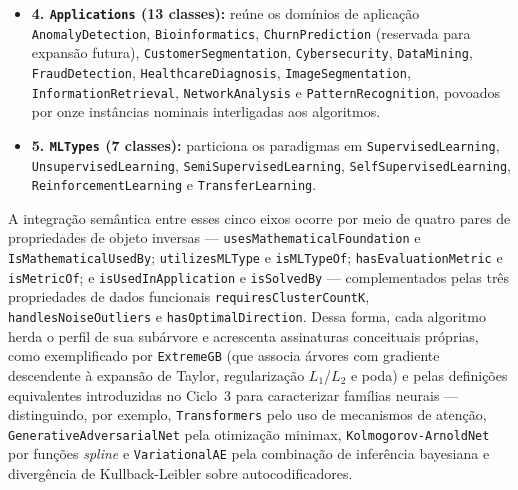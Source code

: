 \documentclass[11pt,a4paper]{article}
\newcommand{\onto}[1]{\texttt{\small #1}}
\begin{document}
{\begin{itemize}[leftmargin=*,nosep]
  \item \textbf{4. \onto{Applications} (13 classes):} reúne os domínios de aplicação \onto{AnomalyDetection}, \onto{Bioinformatics}, \onto{ChurnPrediction} (reservada para expansão futura), \onto{CustomerSegmentation}, \onto{Cybersecurity}, \onto{DataMining}, \onto{FraudDetection}, \onto{HealthcareDiagnosis}, \onto{ImageSegmentation}, \onto{InformationRetrieval}, \onto{NetworkAnalysis} e \onto{PatternRecognition}, povoados por onze instâncias nominais interligadas aos algoritmos.

  \item \textbf{5. \onto{MLTypes} (7 classes):} particiona os paradigmas em \onto{SupervisedLearning}, \onto{UnsupervisedLearning}, \onto{SemiSupervisedLearning}, \onto{SelfSupervisedLearning}, \onto{ReinforcementLearning} e \onto{TransferLearning}.
\end{itemize}

A integração semântica entre esses cinco eixos ocorre por meio de quatro pares de propriedades de objeto inversas --- \onto{usesMathematicalFoundation} e \onto{IsMathematicalUsedBy}; \onto{utilizesMLType} e \onto{isMLTypeOf}; \onto{hasEvaluationMetric} e \onto{isMetricOf}; e \onto{isUsedInApplication} e \onto{isSolvedBy} --- complementados pelas três propriedades de dados funcionais \onto{requiresClusterCountK}, \onto{handlesNoiseOutliers} e \onto{hasOptimalDirection}. Dessa forma, cada algoritmo herda o perfil de sua subárvore e acrescenta assinaturas conceituais próprias, como exemplificado por \onto{ExtremeGB} (que associa árvores com gradiente descendente à expansão de Taylor, regularização $L_1$/$L_2$ e poda) e pelas definições equivalentes introduzidas no Ciclo~3 para caracterizar famílias neurais --- distinguindo, por exemplo, \onto{Transformers} pelo uso de mecanismos de atenção, \onto{GenerativeAdversarialNet} pela otimização minimax, \onto{Kolmogorov-ArnoldNet} por funções \emph{spline} e \onto{VariationalAE} pela combinação de inferência bayesiana e divergência de Kullback-Leibler sobre autocodificadores.
}
\end{document}
